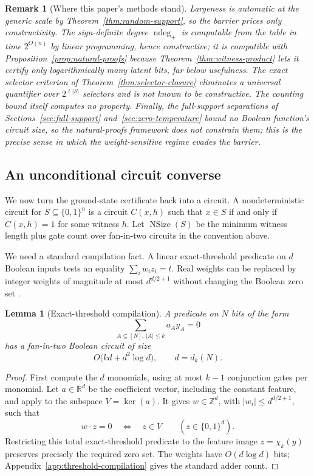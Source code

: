 \documentclass{article}
\newcommand{\NSize}{\operatorname{NSize}}
\newcommand{\ndeg}{\operatorname{ndeg}}
\newcommand{\bits}{\{0,1\}}
\newtheorem{lemma}{Lemma}
\newtheorem{remark}{Remark}
\begin{document}
\begin{remark}[Where this paper's methods stand]\label{rem:natural-methods}
Largeness is automatic at the generic scale by
Theorem~\ref{thm:random-support}, so the barrier prices only constructivity.
The sign-definite degree $\ndeg_+$ is computable from the table in time
$2^{O(n)}$ by linear programming, hence constructive; it is compatible with
Proposition~\ref{prop:natural-proofs} because
Theorem~\ref{thm:witness-product} lets it certify only logarithmically many
latent bits, far below usefulness.  The exact selector criterion of
Theorem~\ref{thm:selector-closure} eliminates a universal quantifier over
$2^{\ell|S|}$ selectors and is not known to be constructive.  The counting
bound itself computes no property.  Finally, the full-support separations of
Sections~\ref{sec:full-support} and~\ref{sec:zero-temperature} bound no
Boolean function's circuit size, so the natural-proofs framework does not
constrain them; this is the precise sense in which the weight-sensitive
regime evades the barrier.
\end{remark}

\subsection{An unconditional circuit converse}

We now turn the ground-state certificate back into a circuit.  A nondeterministic
circuit for $S\subseteq\bits^n$ is a circuit $C(x,h)$ such that
$x\in S$ if and only if $C(x,h)=1$ for some witness $h$.  Let $\NSize(S)$ be
the minimum witness length plus gate count over fan-in-two circuits in the
convention above.

We need a standard compilation fact.  A linear exact-threshold predicate on
$d$ Boolean inputs tests an equality $\sum_i w_i z_i=t$.  Real weights can be
replaced by integer weights of magnitude at most $d^{d/2+1}$ without changing
the Boolean zero set \cite[Theorem~6]{babai21}.

\begin{lemma}[Exact-threshold compilation]\label{lem:exact-threshold}
A predicate on $N$ bits of the form
\[
  \sum_{A\subseteq[N],\ |A|\le k}a_A y_A=0
\]
has a fan-in-two Boolean circuit of size
\[
  O\bigl(kd+d^2\log d\bigr),
  \qquad d=d_k(N).
\]
\end{lemma}

\begin{proof}
First compute the $d$ monomials, using at most $k-1$ conjunction gates per
monomial.  Let $a\in\mathbb R^d$ be the coefficient vector, including the
constant feature, and apply \cite[Theorem~6]{babai21} to the subspace
$V=\ker(a)$.  It gives $w\in\mathbb Z^d$, with
$|w_i|\le d^{d/2+1}$, such that
\[
  w\cdot z=0\quad\Longleftrightarrow\quad z\in V
  \qquad(z\in\bits^d).
\]
Restricting this total exact-threshold predicate to the feature image
$z=\chi_k(y)$ preserves precisely the required zero set.  The weights have
$O(d\log d)$ bits; Appendix~\ref{app:threshold-compilation} gives the standard
adder count.
\end{proof}
\end{document}
